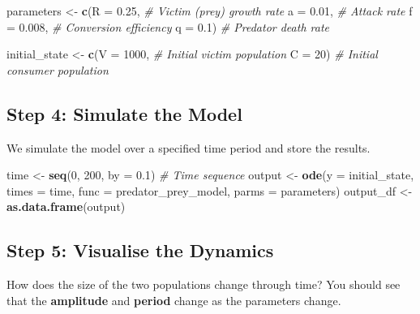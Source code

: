 \documentclass[
  a4paper]{book}
\newenvironment{Shaded}{\begin{snugshade}}{\end{snugshade}}
\newcommand{\AttributeTok}[1]{\textcolor[rgb]{0.13,0.29,0.53}{#1}}
\newcommand{\CommentTok}[1]{\textcolor[rgb]{0.56,0.35,0.01}{\textit{#1}}}
\newcommand{\DecValTok}[1]{\textcolor[rgb]{0.00,0.00,0.81}{#1}}
\newcommand{\FloatTok}[1]{\textcolor[rgb]{0.00,0.00,0.81}{#1}}
\newcommand{\FunctionTok}[1]{\textcolor[rgb]{0.13,0.29,0.53}{\textbf{#1}}}
\newcommand{\NormalTok}[1]{#1}
\newcommand{\OtherTok}[1]{\textcolor[rgb]{0.56,0.35,0.01}{#1}}
\begin{document}
\begin{Shaded}
\begin{Highlighting}[]
\NormalTok{parameters }\OtherTok{\textless{}{-}} \FunctionTok{c}\NormalTok{(}\AttributeTok{R =} \FloatTok{0.25}\NormalTok{, }\CommentTok{\# Victim (prey) growth rate}
                \AttributeTok{a =} \FloatTok{0.01}\NormalTok{, }\CommentTok{\# Attack rate}
                \AttributeTok{f =} \FloatTok{0.008}\NormalTok{, }\CommentTok{\# Conversion efficiency}
                \AttributeTok{q =} \FloatTok{0.1}\NormalTok{)  }\CommentTok{\# Predator death rate}

\NormalTok{initial\_state }\OtherTok{\textless{}{-}} \FunctionTok{c}\NormalTok{(}\AttributeTok{V =} \DecValTok{1000}\NormalTok{,  }\CommentTok{\# Initial victim population}
                   \AttributeTok{C =} \DecValTok{20}\NormalTok{)   }\CommentTok{\# Initial consumer population}
\end{Highlighting}
\end{Shaded}

\subsection{Step 4: Simulate the Model}\label{step-4-simulate-the-model}

We simulate the model over a specified time period and store the results.

\begin{Shaded}
\begin{Highlighting}[]
\NormalTok{time }\OtherTok{\textless{}{-}} \FunctionTok{seq}\NormalTok{(}\DecValTok{0}\NormalTok{, }\DecValTok{200}\NormalTok{, }\AttributeTok{by =} \FloatTok{0.1}\NormalTok{)  }\CommentTok{\# Time sequence}
\NormalTok{output }\OtherTok{\textless{}{-}} \FunctionTok{ode}\NormalTok{(}\AttributeTok{y =}\NormalTok{ initial\_state, }\AttributeTok{times =}\NormalTok{ time, }\AttributeTok{func =}\NormalTok{ predator\_prey\_model, }\AttributeTok{parms =}\NormalTok{ parameters)}
\NormalTok{output\_df }\OtherTok{\textless{}{-}} \FunctionTok{as.data.frame}\NormalTok{(output)}
\end{Highlighting}
\end{Shaded}

\subsection{Step 5: Visualise the Dynamics}\label{step-5-visualise-the-dynamics}

How does the size of the two populations change through time? You should see that the \textbf{amplitude} and \textbf{period} change as the parameters change.
\end{document}
